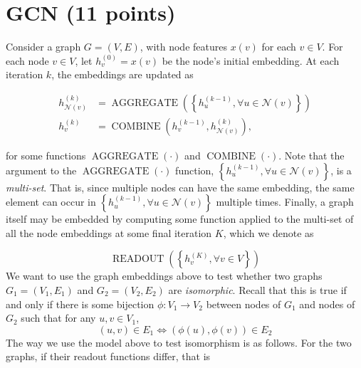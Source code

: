 \section{GCN (11 points)}



Consider a graph $G = (V, E)$, with node features $x(v)$ for each $v \in V$. For each node $v \in V$, let $h^{(0)}_v = x(v)$ be the node’s initial embedding. At each iteration $k$, the embeddings are updated as

$$
    \begin{aligned}
        h_{\mathcal{N}(v)}^{(k)} & =\operatorname{AGGREGATE}\left(\left\{h_u^{(k-1)}, \forall u \in \mathcal{N}(v)\right\}\right) \\
        h_v^{(k)}                & =\operatorname{COMBINE}\left(h_v^{(k-1)}, h_{\mathcal{N}(v)}^{(k)}\right),
    \end{aligned}
$$

\noindent for some functions $\operatorname{AGGREGATE}(\cdot)$ and $\operatorname{COMBINE}(\cdot)$. Note that the argument to the $\operatorname{AGGREGATE}(\cdot)$ function, $\left\{ h^{(k-1)}_u, \forall u \in \mathcal{N}(v) \right\}$, is a \textit{multi-set}.
That is, since multiple nodes can have the same embedding, the same element can occur in $ \left\{h^{(k-1)}_u, \forall u \in \mathcal{N}(v) \right\}$ multiple times.
Finally, a graph itself may be embedded by computing some function applied to the multi-set of all the node embeddings at some final iteration $K$, which we denote as

$$\operatorname { READOUT }\left(\left\{h_v^{(K)}, \forall v \in V\right\}\right)$$
\noindent
We want to use the graph embeddings above to test whether two graphs $G_1 = (V_1, E_1)$ and $G_2 = (V_2, E_2)$ are \textit{isomorphic}.
Recall that this is true if and only if there is some bijection $\phi : V_1 \rightarrow V_2$ between nodes of $G_1$ and nodes of $G_2$ such that for any $u, v \in V_1$,
$$(u, v) \in E_1 \Leftrightarrow (\phi(u), \phi(v)) \in E_2$$
\noindent
The way we use the model above to test isomorphism is as follows. For the two graphs, if their readout functions differ, that is


